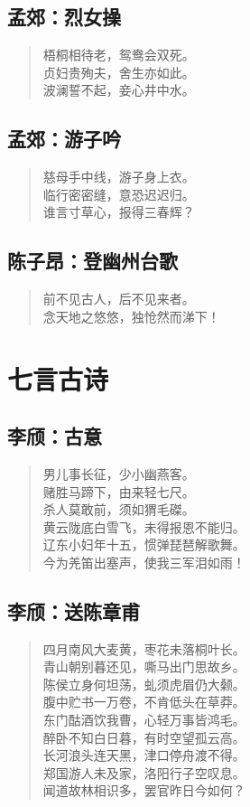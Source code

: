 \documentclass[12pt,oneside]{book}
\newenvironment{shici}{
\begin{verse}
\centering\large\hspace{12pt}}
{\end{verse}}
\begin{document}
\chapter{孟郊：烈女操}
\begin{shici}
梧桐相待老，鸳鸯会双死。\\
贞妇贵殉夫，舍生亦如此。\\
波澜誓不起，妾心井中水。
\end{shici}

\chapter{孟郊：游子吟}
\begin{shici}
慈母手中线，游子身上衣。\\
临行密密缝，意恐迟迟归。\\
谁言寸草心，报得三春辉？
\end{shici}

\chapter{陈子昂：登幽州台歌}
\begin{shici}
前不见古人，后不见来者。\\
念天地之悠悠，独怆然而涕下！
\end{shici}

\part{七言古诗}
\chapter{李颀：古意}
\begin{shici}
男儿事长征，少小幽燕客。\\
赌胜马蹄下，由来轻七尺。\\
杀人莫敢前，须如猬毛磔。\\
黄云陇底白雪飞，未得报恩不能归。\\
辽东小妇年十五，惯弹琵琶解歌舞。\\
今为羌笛出塞声，使我三军泪如雨！
\end{shici}

\chapter{李颀：送陈章甫}
\begin{shici}
四月南风大麦黄，枣花未落桐叶长。\\
青山朝别暮还见，嘶马出门思故乡。\\
陈侯立身何坦荡，虬须虎眉仍大颡。\\
腹中贮书一万卷，不肯低头在草莽。\\
东门酤酒饮我曹，心轻万事皆鸿毛。\\
醉卧不知白日暮，有时空望孤云高。\\
长河浪头连天黑，津口停舟渡不得。\\
郑国游人未及家，洛阳行子空叹息。\\
闻道故林相识多，罢官昨日今如何？
\end{shici}
\end{document}
